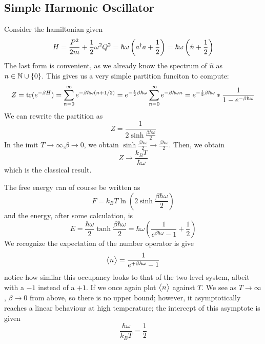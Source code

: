 \subsection{Simple Harmonic Oscillator}
Consider the hamiltonian given
\[H = \frac{P^2}{2m}+\frac{1}{2}\omega^2Q^2 = \hbar\omega\left(a^{\dagger} a +\frac{1}{2}\right) = \hbar\omega\left(\hat n +\frac{1}{2}\right)\]
The last form is convenient, as we already know the spectrum of \(\hat n\) as \(n\in \mathbb{N}\cup \{0\}\).
This gives us a very simple partition funciton to compute:
\[Z = \operatorname{tr}(e^{-\beta H}) = \sum_{n=0}^\infty e^{-\beta \hbar \omega(n+1/2)} = e^{-\frac{1}{2}\beta\hbar\omega}\sum_{n=0}^\infty e^{-\beta\hbar\omega n} = e^{-\frac{1}{2}\beta\hbar\omega}*\frac{1}{1-e^{-\beta \hbar\omega}}\]
We can rewrite the partition as
\begin{equation}
	Z = \frac{1}{2\sinh\frac{\beta\hbar\omega}{2}}
\end{equation}
In the imit \(T\to\infty\),\(\beta\to 0 \), we obtain \(\sinh \frac{\beta\hbar\omega}{2}\to\frac{\beta\hbar\omega}{2}\). Then, we obtain
\[Z \to \frac{k_BT}{\hbar\omega}\]
which is the classical result.

The free energy can of course be written as
\[F = k_BT\ln \left(2\sinh \frac{\beta\hbar\omega}{2}\right)\]
and the energy, after some calculation, is
\begin{equation}
E = \frac{\hbar\omega}{2}\tanh \frac{\beta\hbar\omega}{2} = \hbar\omega\left(\frac{1}{e^{\beta\hbar\omega}-1}+\frac{1}{2}\right)
\end{equation}
We recognize the expectation of the number operator is give
\begin{equation}
	\left\langle \begin{matrix}n\end{matrix} \right\rangle = \frac{1}{e^{+\beta\hbar\omega}-1}
\end{equation}
notice how similar this occupancy looks to that of the two-level system, albeit with a \(-1\) instead of a \(+1\). If we once again plot \(\left\langle \begin{matrix}n\end{matrix} \right\rangle\) against \(T\). We see as \(T\to\infty\), \(\beta\to0\) from above, so there is no upper bound; however, it asymptotically reaches a linear behaviour at high temperature; the intercept of this asymptote is given
\[\frac{\hbar\omega}{k_BT} = \frac{1}{2}\]


